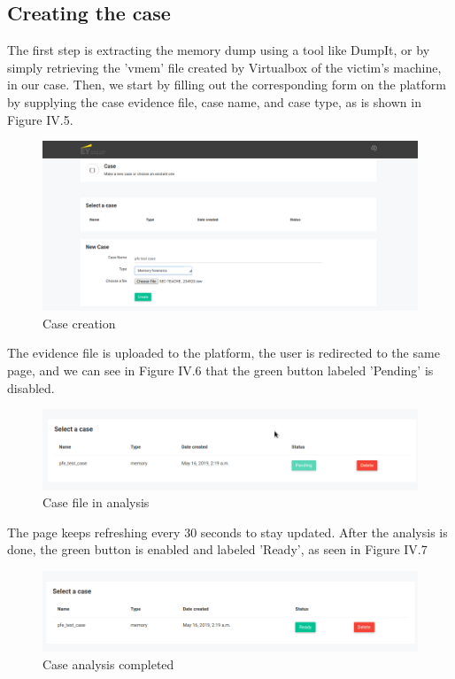 \subsection{Creating the case}
The first step is extracting the memory dump using a tool like DumpIt\cite{dumpit}, or by simply retrieving the 'vmem' file created by Virtualbox of the victim's machine, in our case. Then, we start by filling out the corresponding form on the platform by supplying the case evidence file, case name, and case type, as is shown in Figure IV.5.
\begin{figure}[H]
\centering
\includegraphics[width=0.9\columnwidth]{Figures/5.png}
\caption{Case creation}
\end{figure}
The evidence file is uploaded to the platform, the user is redirected to the same page, and we can see in Figure IV.6 that the green button labeled 'Pending' is disabled.
\begin{figure}[H]
\centering
\includegraphics[width=0.9\columnwidth]{Figures/6.png}
\caption{Case file in analysis}
\end{figure}
The page keeps refreshing every 30 seconds to stay updated. After the analysis is done, the green button is enabled and labeled 'Ready', as seen in Figure IV.7
\begin{figure}[H]
\centering
\includegraphics[width=0.9\columnwidth]{Figures/7.png}
\caption{Case analysis completed}
\end{figure}

